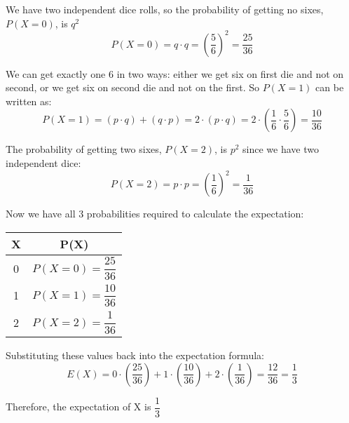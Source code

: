 \documentclass[journal,12pt,twocolumn]{IEEEtran}
\begin{document}
\noindent We have two independent dice rolls, so the probability of getting no sixes, $P(X = 0)$, is $q^2$
\[ P(X = 0) = q \cdot q =  \left(\frac{5}{6}\right)^2 = \frac{25}{36} \]

\noindent We can get exactly one 6 in two ways: either we get six on first die and not on second, or we get six on second die and not on the first. So $P(X = 1)$ can be written as:
\[ P(X = 1) = (p \cdot q) + (q \cdot p) = 2 \cdot (p \cdot q) = 2 \cdot \left(\frac{1}{6} \cdot \frac{5}{6}\right) = \frac{10}{36} \]

\noindent The probability of getting two sixes, $P(X = 2)$, is $p^2$ since we have two independent dice:
\[ P(X = 2) = p \cdot p = \left(\frac{1}{6}\right)^2 = \frac{1}{36} \]

\noindent Now we have all 3 probabilities required to calculate the expectation:

\begin{table}[!htbp]
\centering
\begin{tabular}{|c|c|}
\hline
X & P(X) \\
\hline
\hline
0 & $P(X = 0) = \dfrac{25}{36}$ \\
\hline
1 & $P(X = 1) = \dfrac{10}{36}$ \\
\hline
2 & $P(X = 2) = \dfrac{1}{36}$ \\
\hline

\end{tabular}
\end{table}


\noindent Substituting these values back into the expectation formula:
\[ E(X) = 0 \cdot \left(\frac{25}{36}\right) + 1 \cdot \left(\frac{10}{36}\right) + 2 \cdot \left(\frac{1}{36}\right) = \frac{12}{36} = \frac{1}{3} \]

Therefore, the expectation of X is ${\dfrac{1}{3}}$
\end{document}
